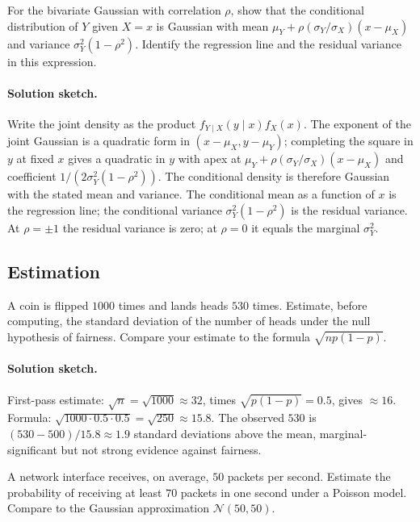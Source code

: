 \begin{exercise}
For the bivariate Gaussian with correlation $\rho$, show that the
conditional distribution of $Y$ given $X = x$ is Gaussian with mean
$\mu_{Y} + \rho (\sigma_{Y}/\sigma_{X})(x - \mu_{X})$ and variance
$\sigma_{Y}^{2}(1 - \rho^{2})$. Identify the regression line and
the residual variance in this expression.
\end{exercise}

\paragraph{Solution sketch.}
Write the joint density as the product $f_{Y \mid X}(y \mid x)
f_{X}(x)$. The exponent of the joint Gaussian is a quadratic form
in $(x - \mu_{X}, y - \mu_{Y})$; completing the square in $y$ at
fixed $x$ gives a quadratic in $y$ with apex at $\mu_{Y} +
\rho(\sigma_{Y}/\sigma_{X})(x - \mu_{X})$ and coefficient
$1/(2\sigma_{Y}^{2}(1 - \rho^{2}))$. The conditional density is
therefore Gaussian with the stated mean and variance. The
conditional mean as a function of $x$ is the regression line; the
conditional variance $\sigma_{Y}^{2}(1 - \rho^{2})$ is the residual
variance. At $\rho = \pm 1$ the residual variance is zero; at
$\rho = 0$ it equals the marginal $\sigma_{Y}^{2}$.

\subsection*{Estimation}

\begin{exercise}
A coin is flipped $1000$ times and lands heads $530$ times.
Estimate, before computing, the standard deviation of the number
of heads under the null hypothesis of fairness. Compare your
estimate to the formula $\sqrt{np(1-p)}$.
\end{exercise}

\paragraph{Solution sketch.}
First-pass estimate: $\sqrt{n} = \sqrt{1000} \approx 32$, times
$\sqrt{p(1-p)} = 0.5$, gives $\approx 16$. Formula: $\sqrt{1000
\cdot 0.5 \cdot 0.5} = \sqrt{250} \approx 15.8$. The observed $530$
is $(530 - 500)/15.8 \approx 1.9$ standard deviations above the
mean, marginal-significant but not strong evidence against
fairness.

\begin{exercise}
A network interface receives, on average, $50$ packets per second.
Estimate the probability of receiving at least $70$ packets in one
second under a Poisson model. Compare to the Gaussian approximation
$\mathcal{N}(50, 50)$.
\end{exercise}

